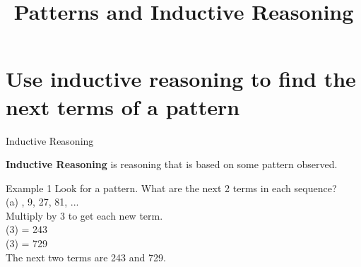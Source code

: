 \documentclass[t]{beamer}
\title{Patterns and Inductive Reasoning}
\author{}
\date{}
\begin{document}
\begin{frame} 
\maketitle
\end{frame}

\section{Use inductive reasoning to find the next terms of a pattern}

\begin{frame}{Inductive Reasoning}
\begin{tcolorbox}[colframe=green!20!black, colback = green!30!white,title=\textbf{Inductive Reasoning}]
\textbf{Inductive Reasoning} is reasoning that is based on some pattern observed.
\end{tcolorbox}
\end{frame}

\begin{frame}{Example 1}
Look for a pattern. What are the next 2 terms in each sequence?	\newline\\
(a)	, 9, 27, 81, ...   \newline\\	\pause
Multiply by 3 to get each new term.	\newline\\	(3) = 243	\newline\\	(3) = 729	\newline\\	\pause
The next two terms are 243 and 729.
\end{frame}
\end{document}
